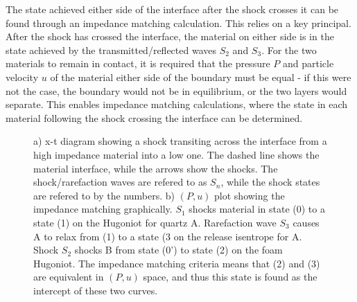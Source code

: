 The state achieved either side of the interface after the shock crosses it can be found through an impedance matching calculation. This relies on a key principal. After the shock has crossed the interface, the material on either side is in the state achieved by the transmitted/reflected waves $S_2$ and $S_3$. For the two materials to remain in contact, it is required that the pressure $P$ and particle velocity $u$ of the material either side of the boundary must be equal - if this were not the case, the boundary would not be in equilibrium, or the two layers would separate. This enables impedance matching calculations, where the state in each material following the shock crossing the interface can be determined.

\begin{figure}
\centering     %
{}
\caption{ \label{fig:ShockDiagramAndIMTheory1} a) x-t diagram showing a shock transiting across the interface from a high impedance material into a low one. The dashed line shows the material interface, while the arrows show the shocks. The shock/rarefaction waves are refered to as $S_n$, while the shock states are refered to by the numbers. b) $(P,u)$ plot showing the impedance matching graphically. $S_1$ shocks material in state (0) to a state (1) on the Hugoniot for quartz A. Rarefaction wave $S_3$ causes A to relax from (1) to a state (3 on the release isentrope for A. Shock $S_2$ shocks B from state (0') to state (2) on the foam Hugoniot. The impedance matching criteria means that (2) and (3) are equivalent in $(P,u)$ space, and thus this state is found as the intercept of these two curves.}
\end{figure}

